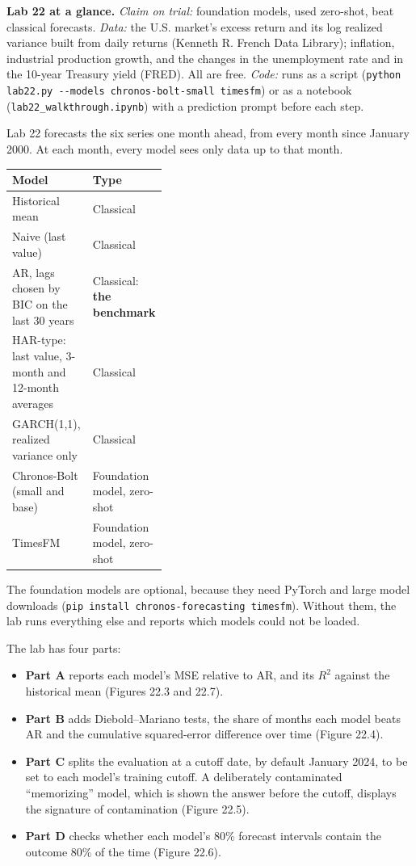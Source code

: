 \begin{callout}
\textbf{Lab 22 at a glance.} \emph{Claim on trial:} foundation models, used zero-shot, beat classical forecasts. \emph{Data:} the U.S. market's excess return and its log realized variance built from daily returns (Kenneth R. French Data Library); inflation, industrial production growth, and the changes in the unemployment rate and in the 10-year Treasury yield (FRED). All are free. \emph{Code:} runs as a script (\texttt{python lab22.py -{}-models chronos-bolt-small timesfm}) or as a notebook (\texttt{lab22\_walkthrough.ipynb}) with a prediction prompt before each step.
\end{callout}

Lab 22 forecasts the six series one month ahead, from every month since January 2000. At each month, every model sees only data up to that month.

\begin{center}
\small
\begin{tabularx}{0.9\linewidth}{@{}>{\raggedright\arraybackslash}X>{\raggedright\arraybackslash}p{0.38\linewidth}@{}}
\toprule
Model & Type \\
\midrule
Historical mean & Classical \\
Naive (last value) & Classical \\
AR, lags chosen by BIC on the last 30 years & Classical: \textbf{the benchmark} \\
HAR-type: last value, 3-month and 12-month averages & Classical \\
GARCH(1,1), realized variance only & Classical \\
Chronos-Bolt (small and base) & Foundation model, zero-shot \\
TimesFM & Foundation model, zero-shot \\
\bottomrule
\end{tabularx}
\end{center}

The foundation models are optional, because they need PyTorch and large model downloads (\texttt{pip install chronos-forecasting timesfm}). Without them, the lab runs everything else and reports which models could not be loaded.

The lab has four parts:

\begin{itemize}
  \item \textbf{Part A} reports each model's MSE relative to AR, and its $R^2$ against the historical mean (Figures 22.3 and 22.7).
  \item \textbf{Part B} adds Diebold--Mariano tests, the share of months each model beats AR and the cumulative squared-error difference over time (Figure 22.4).
  \item \textbf{Part C} splits the evaluation at a cutoff date, by default January 2024, to be set to each model's training cutoff. A deliberately contaminated ``memorizing'' model, which is shown the answer before the cutoff, displays the signature of contamination (Figure 22.5).
  \item \textbf{Part D} checks whether each model's 80\% forecast intervals contain the outcome 80\% of the time (Figure 22.6).
\end{itemize}

